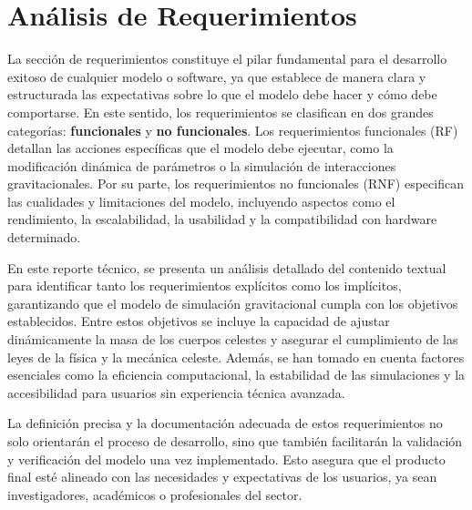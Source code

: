 \section{Análisis de Requerimientos}

La sección de requerimientos constituye el pilar fundamental para el desarrollo exitoso de cualquier modelo o software, ya que establece de manera clara y estructurada las expectativas sobre lo que el modelo debe hacer y cómo debe comportarse. En este sentido, los requerimientos se clasifican en dos grandes categorías: \textbf{funcionales} y \textbf{no funcionales}. Los requerimientos funcionales (RF) detallan las acciones específicas que el modelo debe ejecutar, como la modificación dinámica de parámetros o la simulación de interacciones gravitacionales. Por su parte, los requerimientos no funcionales (RNF) especifican las cualidades y limitaciones del modelo, incluyendo aspectos como el rendimiento, la escalabilidad, la usabilidad y la compatibilidad con hardware determinado.

En este reporte técnico, se presenta un análisis detallado del contenido textual para identificar tanto los requerimientos explícitos como los implícitos, garantizando que el modelo de simulación gravitacional cumpla con los objetivos establecidos. Entre estos objetivos se incluye la capacidad de ajustar dinámicamente la masa de los cuerpos celestes y asegurar el cumplimiento de las leyes de la física y la mecánica celeste. Además, se han tomado en cuenta factores esenciales como la eficiencia computacional, la estabilidad de las simulaciones y la accesibilidad para usuarios sin experiencia técnica avanzada.

La definición precisa y la documentación adecuada de estos requerimientos no solo orientarán el proceso de desarrollo, sino que también facilitarán la validación y verificación del modelo una vez implementado. Esto asegura que el producto final esté alineado con las necesidades y expectativas de los usuarios, ya sean investigadores, académicos o profesionales del sector.

\vspace{0.2cm}
